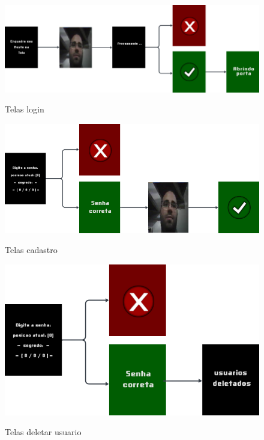 \begin{figure}[h!]
    \centering
    \caption{Telas login}
    \includegraphics[scale=2.2]{figuras/fluxo_login.png}
    \fonte{}%
    \label{fig:fluxologin}
    \centering
\end{figure}

\begin{figure}[h!]
    \centering
    \caption{Telas cadastro}
    \includegraphics[scale=2.5]{figuras/fluxo_cadastro.png}
    \fonte{}%
    \label{fig:fluxocadastro}
    \centering
\end{figure}

\begin{figure}[h!]
    \centering
    \caption{Telas deletar usuario}
    \includegraphics[scale=2.5]{figuras/fluxo_deletar_usuario.png}
    \fonte{}%
    \label{fig:fluxosenha}
    \centering
\end{figure}

